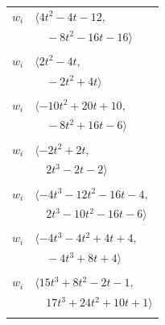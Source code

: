 \documentclass[11pt]{article}
\begin{document}
\begin{longtable}{@{}ll@{}}
$w_i$ & $\langle 4t^{2}-4t-12,$\\
 & $\quad -8t^{2}-16t-16\rangle$\\
\addlinespace[2pt]
\multicolumn{2}{@{}p{0.97\textwidth}@{}}{$i=6$, $D_i=2$, $\rho_{ij}$: $9{:}2, \allowbreak 10{:}1, \allowbreak 11{:}2, \allowbreak 18{:}1, \allowbreak 21{:}1, \allowbreak 28{:}2$}\\
$w_i$ & $\langle 2t^{2}-4t,$\\
 & $\quad -2t^{2}+4t\rangle$\\
\addlinespace[2pt]
\multicolumn{2}{@{}p{0.97\textwidth}@{}}{$i=7$, $D_i=14$, $\rho_{ij}$: $0{:}2, \allowbreak 9{:}2, \allowbreak 14{:}1, \allowbreak 19{:}1$}\\
$w_i$ & $\langle -10t^{2}+20t+10,$\\
 & $\quad -8t^{2}+16t-6\rangle$\\
\addlinespace[2pt]
\multicolumn{2}{@{}p{0.97\textwidth}@{}}{$i=8$, $D_i=1$, $\rho_{ij}$: $1{:}2, \allowbreak 9{:}1, \allowbreak 15{:}2, \allowbreak 16{:}1$}\\
$w_i$ & $\langle -2t^{2}+2t,$\\
 & $\quad 2t^{3}-2t-2\rangle$\\
\addlinespace[2pt]
\multicolumn{2}{@{}p{0.97\textwidth}@{}}{$i=9$, $D_i=8$, $\rho_{ij}$: $2{:}1, \allowbreak 5{:}2, \allowbreak 6{:}1, \allowbreak 7{:}1, \allowbreak 8{:}2, \allowbreak 14{:}2, \allowbreak 20{:}2, \allowbreak 22{:}1$}\\
$w_i$ & $\langle -4t^{3}-12t^{2}-16t-4,$\\
 & $\quad 2t^{3}-10t^{2}-16t-6\rangle$\\
\addlinespace[2pt]
\multicolumn{2}{@{}p{0.97\textwidth}@{}}{$i=10$, $D_i=2$, $\rho_{ij}$: $0{:}2, \allowbreak 6{:}2, \allowbreak 20{:}1, \allowbreak 22{:}1, \allowbreak 25{:}2$}\\
$w_i$ & $\langle -4t^{3}-4t^{2}+4t+4,$\\
 & $\quad -4t^{3}+8t+4\rangle$\\
\addlinespace[2pt]
\multicolumn{2}{@{}p{0.97\textwidth}@{}}{$i=11$, $D_i=4$, $\rho_{ij}$: $1{:}2, \allowbreak 6{:}1, \allowbreak 15{:}2, \allowbreak 16{:}1, \allowbreak 17{:}2, \allowbreak 22{:}1, \allowbreak 27{:}2$}\\
$w_i$ & $\langle 15t^{3}+8t^{2}-2t-1,$\\
 & $\quad 17t^{3}+24t^{2}+10t+1\rangle$\\
\addlinespace[2pt]
\multicolumn{2}{@{}p{0.97\textwidth}@{}}{$i=12$, $D_i=2$, $\rho_{ij}$: $1{:}1, \allowbreak 3{:}1, \allowbreak 13{:}1, \allowbreak 14{:}1, \allowbreak 28{:}2$}\\

\end{longtable}
\end{document}
